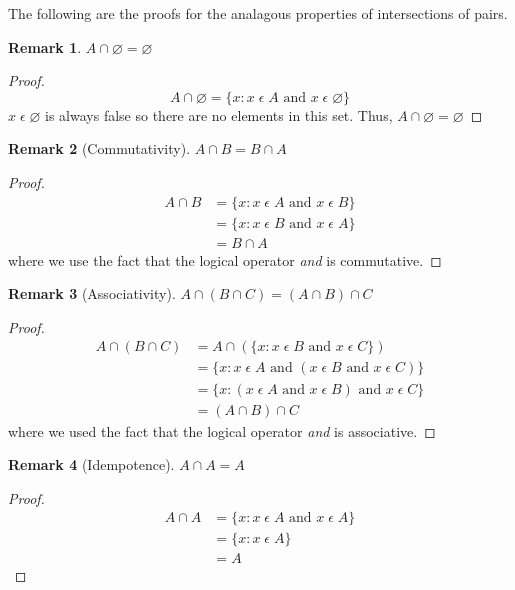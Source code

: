\documentclass[12pt]{article}
\newtheorem{remark}{Remark}
\begin{document}
The following are the proofs for the analagous properties of intersections of pairs.

\begin{remark}
    $A \cap\varnothing = \varnothing$
\end{remark}
\begin{proof}
    \begin{equation*}
        A \cap \varnothing = \{x: x\;\epsilon\;A \text{ and } x\;\epsilon\;\varnothing\}
    \end{equation*}
    $x\;\epsilon\;\varnothing$ is always false so there are no elements in this set. Thus,
    $A \cap\varnothing = \varnothing$
\end{proof}

\begin{remark}[Commutativity]
    $A \cap B = B \cap A$
\end{remark}
\begin{proof}
    \begin{align*}
        A \cap B &= \{x: x\;\epsilon\;A \text{ and } x\;\epsilon\;B\}\\
                 &= \{x: x\;\epsilon\;B \text{ and } x\;\epsilon\;A\}\\
                 &= B \cap A
    \end{align*}
    where we use the fact that the logical operator \textit{and} is commutative.
\end{proof}

\begin{remark}[Associativity]
    $A \cap (B \cap C) = (A \cap B) \cap C$
\end{remark}
\begin{proof}
    \begin{align*}
        A \cap (B \cap C) &= A \cap (\{x: x\;\epsilon\;B \text{ and } x\;\epsilon\;C\})\\
                          &= \{x: x\;\epsilon\;A \text{ and } (x\;\epsilon\;B \text{ and } x\;\epsilon\;C)\}\\
                          &= \{x: (x\;\epsilon\;A \text{ and } x\;\epsilon\;B) \text{ and } x\;\epsilon\;C\}\\
                          &= (A \cap B) \cap C
    \end{align*}
    where we used the fact that the logical operator \textit{and} is associative.
\end{proof}

\begin{remark}[Idempotence]
    $A \cap A = A$
\end{remark}
\begin{proof}
    \begin{align*}
        A \cap A &= \{x: x\;\epsilon\;A \text{ and } x\;\epsilon\;A\}\\
                 &= \{x: x\;\epsilon\;A\}\\
                 &= A
    \end{align*}
\end{proof}
\end{document}
